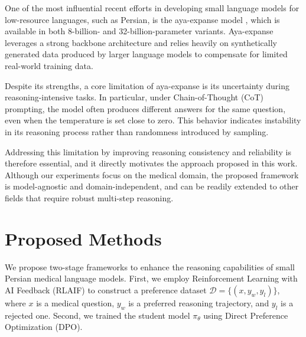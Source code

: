\documentclass[conference]{IEEEtran}
\begin{document}
One of the most influential recent efforts in developing small language models for low-resource languages, such as Persian, is the aya-expanse model \cite{b8} , which is available in both 8-billion- and 32-billion-parameter variants. Aya-expanse leverages a strong backbone architecture and relies heavily on synthetically generated data produced by larger language models to compensate for limited real-world training data.

Despite its strengths, a core limitation of aya-expanse is its uncertainty during reasoning-intensive tasks. In particular, under Chain-of-Thought (CoT) prompting, the model often produces different answers for the same question, even when the temperature is set close to zero. This behavior indicates instability in its reasoning process rather than randomness introduced by sampling.

Addressing this limitation by improving reasoning consistency and reliability is therefore essential, and it directly motivates the approach proposed in this work. Although our experiments focus on the medical domain, the proposed framework is model-agnostic and domain-independent, and can be readily extended to other fields that require robust multi-step reasoning.




          \section{Proposed Methods}
          
We propose two-stage frameworks to enhance the reasoning capabilities of small Persian medical language models. First, we employ Reinforcement Learning with AI Feedback (RLAIF) to construct a preference dataset $\mathcal{D} = \{(x, y_w, y_l)\}$, where $x$ is a medical question, $y_w$ is a preferred reasoning trajectory, and $y_l$ is a rejected one. Second, we trained the student model $\pi_\theta$ using Direct Preference Optimization (DPO).
\end{document}
